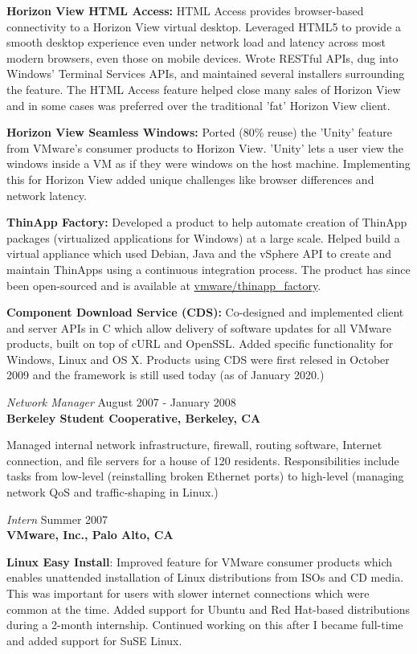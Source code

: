 \documentclass[overlapped,line,margin]{res}
\begin{document}
\begin{resume}
  \textbf{Horizon View HTML Access:} HTML Access provides browser-based
  connectivity to a Horizon View virtual desktop. Leveraged HTML5 to provide
  a smooth desktop experience even under network load and latency across most
  modern browsers, even those on mobile devices. Wrote RESTful APIs, dug into
  Windows' Terminal Services APIs, and maintained several installers
  surrounding the feature. The HTML Access feature helped close many sales
  of Horizon View and in some cases was preferred over the traditional
  'fat' Horizon View client.

  \textbf{Horizon View Seamless Windows:} Ported (80\% reuse) the
  'Unity' feature from VMware's consumer products to Horizon View.
  'Unity' lets a user view the windows inside a VM as if they were
  windows on the host machine. Implementing this for Horizon View added
  unique challenges like browser differences and network latency.

  \textbf{ThinApp Factory:} Developed a product to help automate
  creation of ThinApp packages (virtualized applications for Windows) at
  a large scale. Helped build a virtual appliance which used Debian,
  Java and the vSphere API to create and maintain ThinApps using a
  continuous integration process. The product has since been
  open-sourced and is available at
  \href{https://github.com/vmware/thinapp\_factory}{vmware/thinapp\_factory}.

  \textbf{Component Download Service (CDS):} Co-designed and implemented
  client and server APIs in C which allow delivery of software updates for
  all VMware products, built on top of cURL and OpenSSL. Added specific
  functionality for Windows, Linux and OS X. Products using CDS were
  first relesed in October 2009 and the framework is still used today
  (as of January 2020.)

{\sl Network Manager} \hfill August 2007 - January 2008 \\
\textbf{Berkeley Student Cooperative, Berkeley, CA}

  Managed internal network infrastructure, firewall, routing
  software, Internet connection, and file servers for a house of 120 residents.
  Responsibilities include tasks from low-level (reinstalling broken Ethernet
  ports) to high-level (managing network QoS and traffic-shaping in Linux.)

{\sl Intern} \hfill Summer 2007 \\
\textbf{VMware, Inc., Palo Alto, CA}

  \textbf{Linux Easy Install}: Improved feature for VMware consumer
  products which enables unattended installation of Linux distributions
  from ISOs and CD media. This was important for users with slower
  internet connections which were common at the time. Added support for
  Ubuntu and Red Hat-based distributions during a 2-month internship.
  Continued working on this after I became full-time and added support
  for SuSE Linux.


\end{resume}
\end{document}
